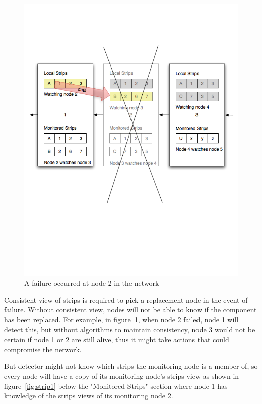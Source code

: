 \begin{figure}[h!]
\centering
    \includegraphics[width=\linewidth]{figures/strip3}
\caption{A failure occurred at node 2 in the network}
\label{fig:strip3}
\end{figure}

Consistent view of strips is required to pick a replacement node in the event
of failure. Without consistent view, nodes will not be able to know if the
component has been replaced.
For example, in figure~\ref{fig:strip3}, when node 2 failed, node 1 will detect
this, but without algorithms to maintain consistency, node 3 would not be
certain if node 1 or 2 are still alive, thus it might take actions that could
compromise the network.

But detector might not know which strips the monitoring node is a member of, so
every node will have a copy of its monitoring node's strips view as shown in
figure~\ref{fig:strip1} below the "Monitored Strips" section where node 1 has
knowledge of the strips views of its monitoring node 2.

